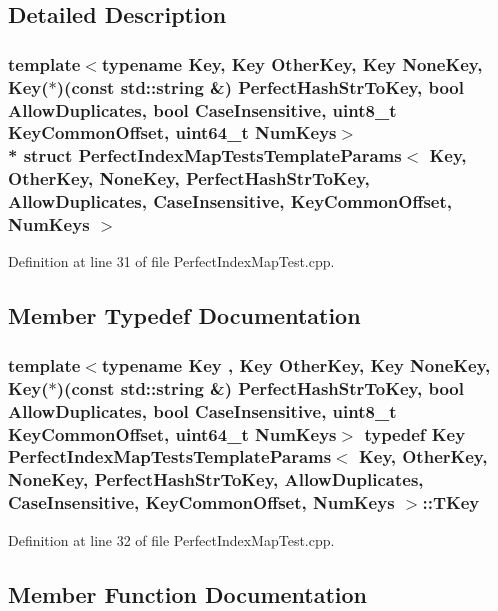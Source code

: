 \subsection{Detailed Description}
\subsubsection*{template$<$typename Key, Key Other\+Key, Key None\+Key, Key($\ast$)(const std\+::string \&) Perfect\+Hash\+Str\+To\+Key, bool Allow\+Duplicates, bool Case\+Insensitive, uint8\+\_\+t Key\+Common\+Offset, uint64\+\_\+t Num\+Keys$>$\\*
struct Perfect\+Index\+Map\+Tests\+Template\+Params$<$ Key, Other\+Key, None\+Key, Perfect\+Hash\+Str\+To\+Key, Allow\+Duplicates, Case\+Insensitive, Key\+Common\+Offset, Num\+Keys $>$}



Definition at line 31 of file Perfect\+Index\+Map\+Test.\+cpp.



\subsection{Member Typedef Documentation}
\subsubsection[{T\+Key}]{\setlength{\rightskip}{0pt plus 5cm}template$<$typename Key , Key Other\+Key, Key None\+Key, Key($\ast$)(const std\+::string \&) Perfect\+Hash\+Str\+To\+Key, bool Allow\+Duplicates, bool Case\+Insensitive, uint8\+\_\+t Key\+Common\+Offset, uint64\+\_\+t Num\+Keys$>$ typedef Key {\bf Perfect\+Index\+Map\+Tests\+Template\+Params}$<$ Key, Other\+Key, None\+Key, Perfect\+Hash\+Str\+To\+Key, Allow\+Duplicates, Case\+Insensitive, Key\+Common\+Offset, Num\+Keys $>$\+::{\bf T\+Key}}\label{structPerfectIndexMapTestsTemplateParams_a141a3924d2fab56fda0b771497a3f225}


Definition at line 32 of file Perfect\+Index\+Map\+Test.\+cpp.



\subsection{Member Function Documentation}
